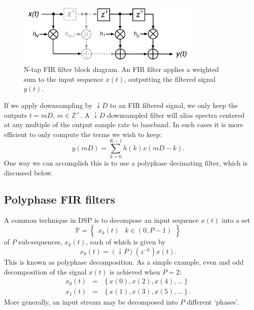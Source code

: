 \documentclass{ws-rv961x669}
\begin{document}
\begin{figure}
 \centering
 \includegraphics[width=0.8\textwidth]{./figures/fir_filter}
 
 \caption{N-tap FIR filter block diagram. An FIR filter applies a weighted sum to the input sequence $x(t)$, outputting the filtered signal $y(t)$. \label{fig:fir}}
\end{figure}

If we apply downsampling by $\downarrow D$ to an FIR filtered signal, we only keep the outputs $t=mD$, $m\in\mathbb{Z}^{+}$. A $\downarrow D$ downsampled filter will alias spectra centered at any multiple of the output sample rate to baseband. In such cases it is more efficient to only compute the terms we wish to keep: 
\begin{equation}
y(mD)=\sum_{k=0}^{K-1}h(k)x(mD-k).\label{eq:FIR-filter-decimated}
\end{equation}
One way we can accomplish this is to use a polyphase decimating filter, which is discussed below. 



\subsection{Polyphase FIR filters}

A common technique in DSP is to decompose an input sequence $x(t)$ into a set
\begin{equation}
\mathbb{P}=\begin{Bmatrix}x_{k}(t) & k\in(0,P-1)\end{Bmatrix}
\end{equation}
of $P$ sub-sequences, $x_{k}(t)$, each of which is given by 
\begin{equation}
x_{k}(t)=(\downarrow P)(z^{-k})x(t).
\end{equation}
This is known as polyphase decomposition. As a simple example, even and odd decomposition of the signal $x(t)$ is achieved when $P=\mbox{2}$:
\begin{eqnarray}
x_{0}(t) & = & \left\{ x(0),x(2),x(4),...\right\} \\
x_{1}(t) & = & \left\{ x(1),x(3),x(5),...\right\} .
\end{eqnarray}
More generally, an input stream may be decomposed into $P$ different `phases'.
\end{document}
